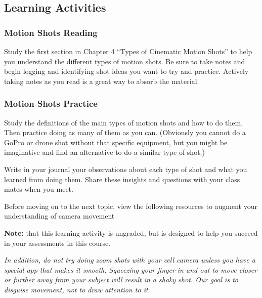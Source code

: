 \documentclass[
]{book}
\begin{document}
\hypertarget{learning-activities-10}{%
\subsection*{Learning Activities}\label{learning-activities-10}}

\begin{reflect}
\hypertarget{motion-shots-reading}{%
\subsubsection*{Motion Shots Reading}\label{motion-shots-reading}}

Study the first section in Chapter 4 ``Types of Cinematic Motion Shots'' to help you understand the different types of motion shots. Be sure to take notes and begin logging and identifying shot ideas you want to try and practice. Actively taking notes as you read is a great way to absorb the material.

\hypertarget{motion-shots-practice}{%
\subsubsection*{Motion Shots Practice}\label{motion-shots-practice}}

Study the definitions of the main types of motion shots and how to do them. Then practice doing as many of them as you can. (Obviously you cannot do a GoPro or drone shot without that specific equipment, but you might be imaginative and find an alternative to do a similar type of shot.)

Write in your journal your observations about each type of shot and what you learned from doing them. Share these insights and questions with your class mates when you meet.

Before moving on to the next topic, view the following resources to augment your understanding of camera movement
\end{reflect}

\begin{caution}
\textbf{Note:} that this learning activity is ungraded, but is designed to help you succeed in your assessments in this course.

\emph{In addition, do not try doing zoom shots with your cell camera unless you have a special app that makes it smooth. Squeezing your finger in and out to move closer or further away from your subject will result in a shaky shot. Our goal is to disguise movement, not to draw attention to it.}
\end{caution}
\end{document}
